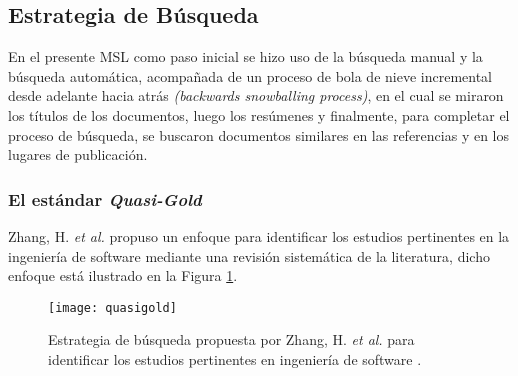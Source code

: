 \subsection{Estrategia de Búsqueda}

En el presente MSL como paso inicial se hizo uso de la búsqueda manual y la búsqueda automática, acompañada de un proceso de bola de nieve incremental desde adelante hacia atrás \textit{(backwards snowballing process)}\cite{Wohlin2014}, en el cual se miraron los títulos de los documentos, luego los resúmenes y finalmente, para completar el proceso de búsqueda, se buscaron documentos similares en las referencias y en los lugares de publicación.

\subsubsection{El estándar \textit{Quasi-Gold}}

Zhang, H. \textit{et al.} \cite{Zhang2011} propuso un enfoque para identificar los estudios pertinentes en la ingeniería de software mediante una revisión sistemática de la literatura, dicho enfoque está ilustrado en la Figura \ref{quasigold}. 
\begin{figure}[h]
    \centering
    \texttt{[image: quasigold]}
    \caption{Estrategia de búsqueda propuesta por Zhang, H. \textit{et al.} para identificar los estudios pertinentes en ingeniería de software \cite{Zhang2011}.}
    \label{quasigold}
\end{figure}

